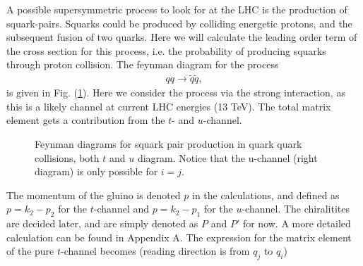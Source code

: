 \documentclass[11pt]{article}
\begin{document}
\begin{flushleft}
A possible supersymmetric process to look for at the LHC is the production of squark-pairs. Squarks could be produced by colliding energetic protons, and the subsequent fusion of two quarks. Here we will calculate the leading order term of the cross section for this process, i.e. the probability of producing squarks through proton collision. The feynman diagram for the process 
\begin{align*}
qq \rightarrow \tilde{q} \tilde{q},
\end{align*}
is given in Fig. (\ref{fig::Feynman qq}). Here we consider the process via the strong interaction, as this is a likely channel at current LHC energies (13 TeV). The total matrix element gets a contribution from the $t$- and $u$-channel.
\begin{figure}[H]
\centering
{}
\caption{Feynman diagrams for squark pair production in quark quark collisions, both $t$ and $u$ diagram. Notice that the u-channel (right diagram) is only possible for $i=j$.}
\label{fig::Feynman qq}
\end{figure}
The momentum of the gluino is denoted $p$ in the calculations, and defined as $p= k_2-p_2 $ for the $t$-channel and $p=k_2-p_1$ for the $u$-channel. The chiralitites are decided later, and are simply denoted as $P$ and $P'$ for now. A more detailed calculation can be found in Appendix A. The expression for the matrix element of the pure $t$-channel becomes (reading direction is from $q_j$ to $q_i$)

\end{flushleft}
\end{document}
